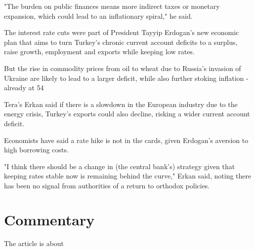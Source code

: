 \documentclass[a4paper,12pt]{article}
\begin{document}
"The burden on public finances means more indirect taxes or monetary expansion, which could lead to an inflationary spiral," he said.

The interest rate cuts were part of President Tayyip Erdogan's new economic plan that aims to turn Turkey's chronic current account deficits to a surplus, raise growth, employment and exports while keeping low rates.

But the rise in commodity prices from oil to wheat due to Russia's invasion of Ukraine are likely to lead to a larger deficit, while also further stoking inflation - already at 54%

Tera's Erkan said if there is a slowdown in the European industry due to the energy crisis, Turkey's exports could also decline, risking a wider current account deficit.

Economists have said a rate hike is not in the cards, given Erdogan's aversion to high borrowing costs.

"I think there should be a change in (the central bank's) strategy given that keeping rates stable now is remaining behind the curve," Erkan said, noting there has been no signal from authorities of a return to orthodox policies.

\section*{Commentary}



The article is about

\end{document}
